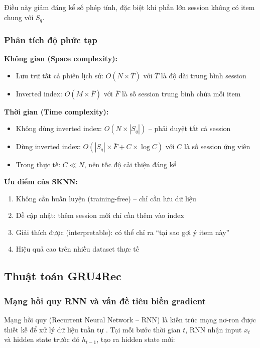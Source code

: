 \documentclass[12pt, a4paper]{article}
\begin{document}
Điều này giảm đáng kể số phép tính, đặc biệt khi phần lớn session không có item chung với $S_q$.

\subsubsection{Phân tích độ phức tạp}

\textbf{Không gian (Space complexity):}
\begin{itemize}
    \item Lưu trữ tất cả phiên lịch sử: $O(N \times \bar{T})$ với $\bar{T}$ là độ dài trung bình session
    \item Inverted index: $O(M \times \bar{F})$ với $\bar{F}$ là số session trung bình chứa mỗi item
\end{itemize}

\textbf{Thời gian (Time complexity):}
\begin{itemize}
    \item Không dùng inverted index: $O(N \times |S_q|)$ -- phải duyệt tất cả session
    \item Dùng inverted index: $O(|S_q| \times \bar{F} + C \times \log C)$ với $C$ là số session ứng viên
    \item Trong thực tế: $C \ll N$, nên tốc độ cải thiện đáng kể
\end{itemize}

\textbf{Ưu điểm của SKNN:}
\begin{enumerate}
    \item Không cần huấn luyện (training-free) -- chỉ cần lưu dữ liệu
    \item Dễ cập nhật: thêm session mới chỉ cần thêm vào index
    \item Giải thích được (interpretable): có thể chỉ ra ``tại sao gợi ý item này''
    \item Hiệu quả cao trên nhiều dataset thực tế
\end{enumerate}


\subsection{Thuật toán GRU4Rec}

\subsubsection{Mạng hồi quy RNN và vấn đề tiêu biến gradient}

Mạng hồi quy (Recurrent Neural Network -- RNN) là kiến trúc mạng nơ-ron được thiết kế để xử lý dữ liệu tuần tự \cite{goodfellow2016}. Tại mỗi bước thời gian $t$, RNN nhận input $x_t$ và hidden state trước đó $h_{t-1}$, tạo ra hidden state mới:
\end{document}
